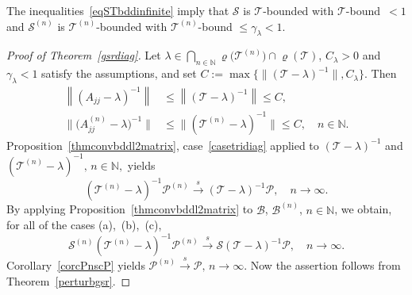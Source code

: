 \documentclass[a4paper,reqno]{amsart}
\begin{document}
\begin{rem}
 The inequalities~\eqref{eqSTbddinfinite} imply that ${\mathcal S}$ is ${\mathcal T}$-bounded with ${\mathcal T}$-bound~$<1$ and ${\mathcal S}^{(n)}$ is ${\mathcal T}^{(n)}$-bounded with ${\mathcal T}^{(n)}$-bound $\leq\gamma_\lambda<1$. 
\end{rem}

\begin{proof}[Proof of Theorem~{\rm\ref{gsrdiag}}]
Let $\lambda\in\underset{n\in{\mathbb{N}}}{\bigcap}\varrho\big({\mathcal T}^{(n)}\big)\cap\varrho({\mathcal T})$, $C_\lambda>0$ and $\gamma_\lambda<1$ satisfy the assumptions, and set $C:=\max\{\|({\mathcal T}-\lambda)^{-1}\|,C_\lambda\}$.
Then
\begin{align*}
\left\| (A_{jj}-\lambda)^{-1}\right\|&\leq \left\| ({\mathcal T}-\lambda)^{-1}\right\|\leq C, \\
\big\|\big(A_{jj}^{(n)}-\lambda\big)^{-1}\big\|&\leq \big\|({\mathcal T}^{(n)}-\lambda)^{-1}\big\|\leq C, \quad n\in{\mathbb{N}}.
 \end{align*}
Proposition~\ref{thmconvbddl2matrix}, case~\ref{casetridiag} applied to $\left({\mathcal T}-\lambda\right)^{-1}$ and $\left({\mathcal T}^{(n)}-\lambda\right)^{-1}, \,n\in{\mathbb{N}},$ yields
$$({\mathcal T}^{(n)}-\lambda)^{-1}{\mathcal P}^{(n)}{\stackrel{s}{\longrightarrow}}({\mathcal T}-\lambda)^{-1}{\mathcal P}, \quad n\to\infty.$$
By applying Proposition~\ref{thmconvbddl2matrix} to ${\mathcal B}$, ${\mathcal B}^{(n)}$, $n\in {\mathbb{N}}$, we obtain, for all of the cases (a),~(b),~(c), 
$${\mathcal S}^{(n)}({\mathcal T}^{(n)}-\lambda)^{-1}{\mathcal P}^{(n)}{\stackrel{s}{\longrightarrow}} {\mathcal S}\left({\mathcal T}-\lambda\right)^{-1}{\mathcal P}, \quad n\to\infty.$$
Corollary~\ref{corcPnscP} yields ${\mathcal P}^{(n)}{\stackrel{s}{\rightarrow}}{\mathcal P}, \, n\to\infty$. 
Now the assertion follows from Theorem~\ref{perturbgsr}.
\end{proof}
\end{document}
